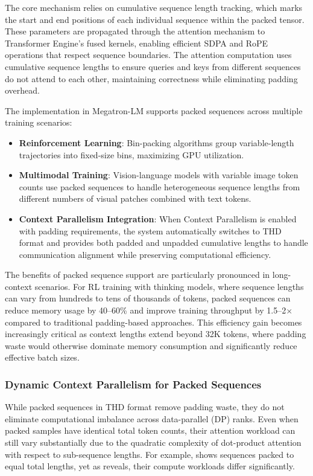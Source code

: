 \documentclass[10pt,logo,copyright]{nvidiatechreport}
\begin{document}
The core mechanism relies on cumulative sequence length tracking, which marks the start and end positions of each individual sequence within the packed tensor. These parameters are propagated through the attention mechanism to Transformer Engine's fused kernels, enabling efficient SDPA and RoPE operations that respect sequence boundaries. The attention computation uses cumulative sequence lengths to ensure queries and keys from different sequences do not attend to each other, maintaining correctness while eliminating padding overhead.

The implementation in Megatron-LM supports packed sequences across multiple training scenarios:
\begin{itemize}
    \item \textbf{Reinforcement Learning}: Bin-packing algorithms group variable-length trajectories into fixed-size bins, maximizing GPU utilization.
    \item \textbf{Multimodal Training}: Vision-language models with variable image token counts use packed sequences to handle heterogeneous sequence lengths from different numbers of visual patches combined with text tokens.
    \item \textbf{Context Parallelism Integration}: When Context Parallelism is enabled with padding requirements, the system automatically switches to THD format and provides both padded and unpadded cumulative lengths to handle communication alignment while preserving computational efficiency.
\end{itemize}

The benefits of packed sequence support are particularly pronounced in long-context scenarios. For RL training with thinking models, where sequence lengths can vary from hundreds to tens of thousands of tokens, packed sequences can reduce memory usage by 40--60\% and improve training throughput by 1.5--2$\times$ compared to traditional padding-based approaches. This efficiency gain becomes increasingly critical as context lengths extend beyond 32K tokens, where padding waste would otherwise dominate memory consumption and significantly reduce effective batch sizes.

\subsubsection{Dynamic Context Parallelism for Packed Sequences}
\label{subsec:dynamic-cp}

While packed sequences in THD format remove padding waste, they do not eliminate computational imbalance across data-parallel (DP) ranks. Even when packed samples have identical total token counts, their attention workload can still vary substantially due to the quadratic complexity of dot-product attention with respect to sub-sequence lengths. For example,  shows sequences packed to equal total lengths, yet as  reveals, their compute workloads differ significantly.
\end{document}
